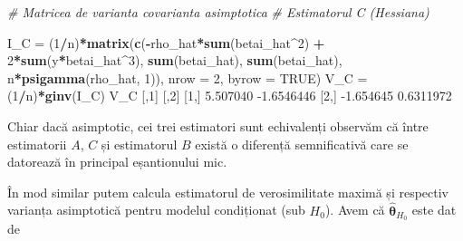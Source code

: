 \documentclass[]{article}
\newenvironment{Shaded}{\begin{snugshade}}{\end{snugshade}}
\newcommand{\CommentTok}[1]{\textcolor[rgb]{0.56,0.35,0.01}{\textit{#1}}}
\newcommand{\DataTypeTok}[1]{\textcolor[rgb]{0.13,0.29,0.53}{#1}}
\newcommand{\DecValTok}[1]{\textcolor[rgb]{0.00,0.00,0.81}{#1}}
\newcommand{\FloatTok}[1]{\textcolor[rgb]{0.00,0.00,0.81}{#1}}
\newcommand{\KeywordTok}[1]{\textcolor[rgb]{0.13,0.29,0.53}{\textbf{#1}}}
\newcommand{\NormalTok}[1]{#1}
\newcommand{\OperatorTok}[1]{\textcolor[rgb]{0.81,0.36,0.00}{\textbf{#1}}}
\newcommand{\OtherTok}[1]{\textcolor[rgb]{0.56,0.35,0.01}{#1}}
\newcommand{\StringTok}[1]{\textcolor[rgb]{0.31,0.60,0.02}{#1}}
\begin{document}
\begin{Shaded}
\begin{Highlighting}[]
\CommentTok{# Matricea de varianta covarianta asimptotica }
\CommentTok{# Estimatorul C (Hessiana)}

\NormalTok{I_C =}\StringTok{ }\NormalTok{(}\DecValTok{1}\OperatorTok{/}\NormalTok{n)}\OperatorTok{*}\KeywordTok{matrix}\NormalTok{(}\KeywordTok{c}\NormalTok{(}\OperatorTok{-}\NormalTok{rho_hat}\OperatorTok{*}\KeywordTok{sum}\NormalTok{(betai_hat}\OperatorTok{^}\DecValTok{2}\NormalTok{) }\OperatorTok{+}\StringTok{ }\DecValTok{2}\OperatorTok{*}\KeywordTok{sum}\NormalTok{(y}\OperatorTok{*}\NormalTok{betai_hat}\OperatorTok{^}\DecValTok{3}\NormalTok{),}
                     \KeywordTok{sum}\NormalTok{(betai_hat),}
                    \KeywordTok{sum}\NormalTok{(betai_hat), }
\NormalTok{                    n}\OperatorTok{*}\KeywordTok{psigamma}\NormalTok{(rho_hat, }\DecValTok{1}\NormalTok{)), }
                  \DataTypeTok{nrow =} \DecValTok{2}\NormalTok{, }
                  \DataTypeTok{byrow =} \OtherTok{TRUE}\NormalTok{)}
\NormalTok{V_C =}\StringTok{ }\NormalTok{(}\DecValTok{1}\OperatorTok{/}\NormalTok{n)}\OperatorTok{*}\KeywordTok{ginv}\NormalTok{(I_C)}
\NormalTok{V_C}
\NormalTok{          [,}\DecValTok{1}\NormalTok{]       [,}\DecValTok{2}\NormalTok{]}
\NormalTok{[}\DecValTok{1}\NormalTok{,]  }\FloatTok{5.507040} \FloatTok{-1.6546446}
\NormalTok{[}\DecValTok{2}\NormalTok{,] }\FloatTok{-1.654645}  \FloatTok{0.6311972}
\end{Highlighting}
\end{Shaded}

Chiar dacă asimptotic, cei trei estimatori sunt echivalenți observăm că
între estimatorii \(A\), \(C\) și estimatorul \(B\) există o diferență
semnificativă care se datorează în principal eșantionului mic.

În mod similar putem calcula estimatorul de verosimilitate maximă și
respectiv varianța asimptotică pentru modelul condiționat (sub \(H_0\)).
Avem că \(\hat{\boldsymbol{\theta}}_{H_0}\) este dat de
\end{document}
